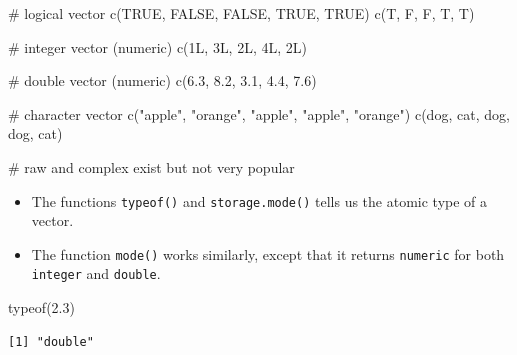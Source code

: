 \documentclass[
  letterpaper,
  DIV=11,
  numbers=noendperiod]{scrreprt}
\newenvironment{Shaded}{\begin{snugshade}}{\end{snugshade}}
\newcommand{\CommentTok}[1]{\textcolor[rgb]{0.37,0.37,0.37}{#1}}
\newcommand{\ConstantTok}[1]{\textcolor[rgb]{0.56,0.35,0.01}{#1}}
\newcommand{\DecValTok}[1]{\textcolor[rgb]{0.68,0.00,0.00}{#1}}
\newcommand{\FloatTok}[1]{\textcolor[rgb]{0.68,0.00,0.00}{#1}}
\newcommand{\FunctionTok}[1]{\textcolor[rgb]{0.28,0.35,0.67}{#1}}
\newcommand{\NormalTok}[1]{\textcolor[rgb]{0.00,0.23,0.31}{#1}}
\newcommand{\StringTok}[1]{\textcolor[rgb]{0.13,0.47,0.30}{#1}}
\begin{document}
\begin{Shaded}
\begin{Highlighting}[]
\CommentTok{\# logical vector}
\FunctionTok{c}\NormalTok{(}\ConstantTok{TRUE}\NormalTok{, }\ConstantTok{FALSE}\NormalTok{, }\ConstantTok{FALSE}\NormalTok{, }\ConstantTok{TRUE}\NormalTok{, }\ConstantTok{TRUE}\NormalTok{)}
\FunctionTok{c}\NormalTok{(T, F, F, T, T)}

\CommentTok{\# integer vector (numeric)}
\FunctionTok{c}\NormalTok{(}\DecValTok{1}\NormalTok{L, }\DecValTok{3}\NormalTok{L, }\DecValTok{2}\NormalTok{L, }\DecValTok{4}\NormalTok{L, }\DecValTok{2}\NormalTok{L)}

\CommentTok{\# double vector (numeric)}
\FunctionTok{c}\NormalTok{(}\FloatTok{6.3}\NormalTok{, }\FloatTok{8.2}\NormalTok{, }\FloatTok{3.1}\NormalTok{, }\FloatTok{4.4}\NormalTok{, }\FloatTok{7.6}\NormalTok{)}

\CommentTok{\# character vector}
\FunctionTok{c}\NormalTok{(}\StringTok{"apple"}\NormalTok{, }\StringTok{"orange"}\NormalTok{, }\StringTok{"apple"}\NormalTok{, }\StringTok{"apple"}\NormalTok{, }\StringTok{"orange"}\NormalTok{)  }
\FunctionTok{c}\NormalTok{(}\StringTok{\textquotesingle{}dog\textquotesingle{}}\NormalTok{, }\StringTok{\textquotesingle{}cat\textquotesingle{}}\NormalTok{, }\StringTok{\textquotesingle{}dog\textquotesingle{}}\NormalTok{, }\StringTok{\textquotesingle{}dog\textquotesingle{}}\NormalTok{, }\StringTok{\textquotesingle{}cat\textquotesingle{}}\NormalTok{)  }

\CommentTok{\# raw and complex exist but not very popular}
\end{Highlighting}
\end{Shaded}

\begin{itemize}
\item
  The functions \texttt{typeof()} and \texttt{storage.mode()} tells us
  the atomic type of a vector.
\item
  The function \texttt{mode()} works similarly, except that it returns
  \texttt{numeric} for both \texttt{integer} and \texttt{double}.
\end{itemize}

\begin{Shaded}
\begin{Highlighting}[]
\FunctionTok{typeof}\NormalTok{(}\FloatTok{2.3}\NormalTok{)}
\end{Highlighting}
\end{Shaded}

\begin{verbatim}
[1] "double"
\end{verbatim}
\end{document}
